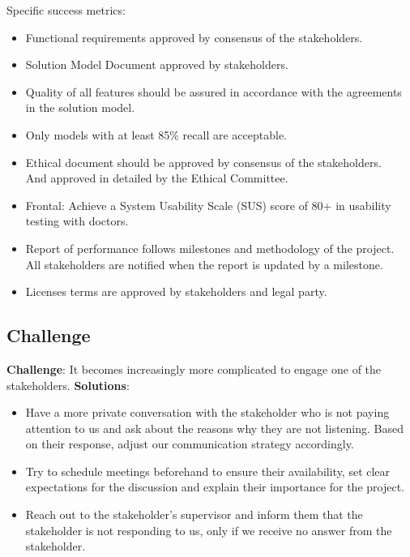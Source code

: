 Specific success metrics:

\begin{itemize}
    \item Functional requirements approved by consensus of the stakeholders.
    \item Solution Model Document approved by stakeholders.
    \item Quality of all features should be assured in accordance with the agreements in the solution model.
    \item Only models with at least 85\% recall are acceptable.
    \item Ethical document should be approved by consensus of the stakeholders. \\
    And approved in detailed by the Ethical Committee.
    \item Frontal: Achieve a System Usability Scale (SUS) score of 80+ in usability testing with doctors.
    \item Report of performance follows milestones and methodology of the project. \\
    All stakeholders are notified when the report is updated by a milestone.
    \item Licenses terms are approved by stakeholders and legal party.
\end{itemize}

\subsection*{Challenge}
\begin{warning}
    \textbf{Challenge}: It becomes increasingly more complicated to engage one of the stakeholders.
    \textbf{Solutions}:
    \begin{itemize}
        \item Have a more private conversation with the stakeholder who is not paying attention to us and ask about the reasons why they are not listening. Based on their response, adjust our communication strategy accordingly.
        \item Try to schedule meetings beforehand to ensure their availability, set clear expectations for the discussion and explain their importance for the project.
        \item Reach out to the stakeholder's supervisor and inform them that the stakeholder is not responding to us, only if we receive no answer from the stakeholder.
    \end{itemize}
\end{warning}


